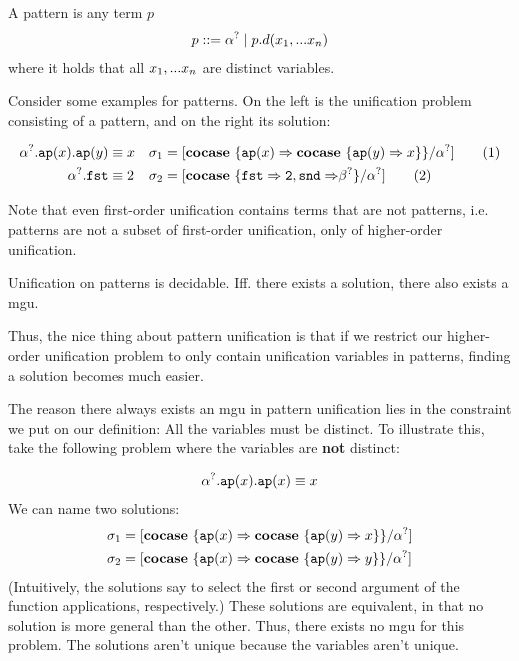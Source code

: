 \documentclass[twoside,12pt,a4paper]{article}
\begin{document}
\begin{definition}[Pattern]
    A pattern is any term $p$ 
    \begin{align*}
        p ::= \alpha^? \;|\; p.d(x_1,...x_n)
    \end{align*}
    where it holds that all $x_1,...x_n$ are distinct variables.
\end{definition}

Consider some examples for patterns. On the left is the unification problem consisting of a pattern, and on the right its solution:
\begin{example}[Pattern]
    \begin{align*}
        \alpha^?.\texttt{ap}(x).\texttt{ap}(y)&\equiv x &\sigma_1 &= [\textbf{cocase}\ \{\texttt{ap}(x)\Rightarrow\textbf{cocase}\ \{\texttt{ap}(y)\Rightarrow x\}\}/\alpha^?] \tag{1}\\
        \alpha^?.\mathtt{fst} &\equiv 2 &\sigma_2 &= [\textbf{cocase}\ \{\mathtt{fst\Rightarrow 2, snd \Rightarrow}\beta^?\}/\alpha^?] \tag{2}
    \end{align*}   
\end{example}

Note that even first-order unification contains terms that are not patterns, i.e.
patterns are not a subset of first-order unification, only of higher-order unification.

\begin{theorem}
    Unification on patterns is decidable.
    Iff. there exists a solution, there also exists a mgu.
\end{theorem}
Thus, the nice thing about pattern unification is that if we restrict our higher-order unification problem to only contain unification variables in patterns, 
finding a solution becomes much easier. 

The reason there always exists an mgu in pattern unification lies in the constraint we put on our definition: All the variables must be distinct. 
To illustrate this, take the following problem where the variables are \textbf{not} distinct:
\begin{example}
    \begin{align*}
        \alpha^?.\texttt{ap}(x).\texttt{ap}(x)\equiv x
    \end{align*}  
    We can name two solutions:
\begin{align*}
    \sigma_1 &= [\textbf{cocase}\ \{\texttt{ap}(x)\Rightarrow \textbf{cocase}\ \{\texttt{ap}(y)\Rightarrow x\}\}/\alpha^?]\\
    \sigma_2 &=[\textbf{cocase}\ \{\texttt{ap}(x)\Rightarrow \textbf{cocase}\ \{\texttt{ap}(y)\Rightarrow y\}\}/\alpha^?]  
\end{align*}
(Intuitively, the solutions say to select the first or second argument of the function applications, respectively.)
These solutions are equivalent, in that no solution is more general than the other. Thus, there exists no mgu for this problem.
The solutions aren't unique because the variables aren't unique.  
\end{example}
\end{document}
